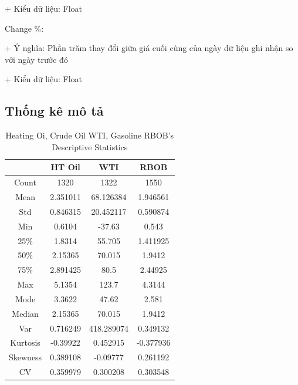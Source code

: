\documentclass[conference]{IEEEtran}
\begin{document}
+ Kiểu dữ liệu: Float

Change \%:

+ Ý nghĩa: Phần trăm thay đổi giữa giá cuối cùng của ngày dữ liệu ghi nhận so với ngày trước đó

+ Kiểu dữ liệu: Float

\subsection{Thống kê mô tả}
\begin{table}[H]
  \centering
  \caption{Heating Oi, Crude Oil WTI, Gasoline RBOB’s Descriptive Statistics}
\begin{tabular}{|>{}c|c|c|c|}
    \hline
      & HT Oil& WTI& RBOB\\ \hline
     Count & 1320
& 1322
& 1550
\\ \hline
     Mean & 2.351011
& 68.126384
& 1.946561
\\ \hline
     Std & 0.846315
& 20.452117
& 0.590874
\\ \hline
     Min & 0.6104
& -37.63
& 0.543
\\ \hline
     25\% & 1.8314
& 55.705
& 1.411925
\\ \hline
     50\% & 2.15365
& 70.015
& 1.9412
\\ \hline
     75\% & 2.891425
& 80.5
& 2.44925
\\ \hline
     Max & 5.1354
& 123.7
& 4.3144
\\ \hline
 Mode& 3.3622
& 47.62
&2.581
\\\hline
 Median& 2.15365
& 70.015
&1.9412
\\\hline
 Var& 0.716249
& 418.289074
&0.349132
\\\hline
 Kurtosis& -0.39922
& 0.452915
&-0.377936
\\\hline
 Skewness& 0.389108
& -0.09777
&0.261192
\\\hline
 CV& 0.359979
& 0.300208
&0.303548
\\\hline
\end{tabular}
\end{table}
\end{document}
